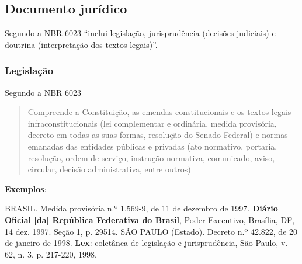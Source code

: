 \subsection{Documento jurídico}

Segundo a NBR 6023 \cite[p.8]{NBR6023:2002} ``inclui legislação, jurisprudência (decisões judiciais) e doutrina (interpretação dos textos legais)''.


\subsubsection{Legislação}

Segundo a NBR 6023 \cite[p.8]{NBR6023:2002}

\begin{quote}
Compreende a Constituição, as emendas constitucionais e os textos legais infraconstitucionais (lei complementar e ordinária, medida provisória, decreto em todas as suas formas, resolução do Senado Federal) e normas emanadas das entidades públicas e privadas (ato normativo, portaria, resolução, ordem de serviço, instrução normativa, comunicado, aviso, circular, decisão administrativa, entre outros) 
\end{quote}

\begin{flushleft}
\begin{singlespace}
\end{singlespace}
\end{flushleft}

\begin{exemplomanual}
\textbf{Exemplos}:\\
\begin{singlespace}
BRASIL. Medida provisória n.º 1.569-9, de 11 de dezembro de 1997. \textbf{Diário Oficial [da] República Federativa do Brasil}, Poder Executivo, Brasília, DF, 14 dez. 1997. Seção 1, p. 29514.
\newline
\newline
SÃO PAULO (Estado). Decreto n.º 42.822, de 20 de janeiro de 1998. \textbf{Lex}: coletânea de legislação e jurisprudência, São Paulo, v. 62, n. 3, p. 217-220, 1998.
\end{singlespace}
\end{exemplomanual}



\begin{flushleft}
\begin{singlespace}
\end{singlespace}
\end{flushleft}

